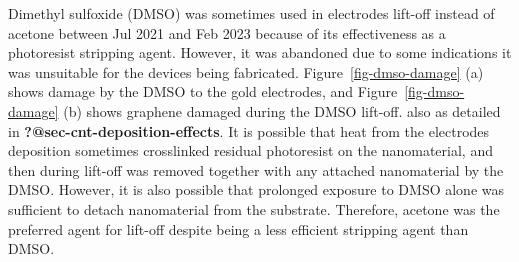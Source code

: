 \documentclass[
  a4paper,
]{scrbook}
\begin{document}
Dimethyl sulfoxide (DMSO) was sometimes used in electrodes lift-off
instead of acetone between Jul 2021 and Feb 2023 because of its
effectiveness as a photoresist stripping agent. However, it was
abandoned due to some indications it was unsuitable for the devices
being fabricated. Figure~\ref{fig-dmso-damage} (a) shows damage by the
DMSO to the gold electrodes, and Figure~\ref{fig-dmso-damage} (b) shows
graphene damaged during the DMSO lift-off. also as detailed in
\textbf{?@sec-cnt-deposition-effects}. It is possible that heat from the
electrodes deposition sometimes crosslinked residual photoresist on the
nanomaterial, and then during lift-off was removed together with any
attached nanomaterial by the DMSO. However, it is also possible that
prolonged exposure to DMSO alone was sufficient to detach nanomaterial
from the substrate. Therefore, acetone was the preferred agent for
lift-off despite being a less efficient stripping agent than DMSO.
\end{document}
